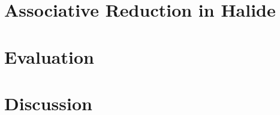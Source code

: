 \documentclass{main}
\begin{document}
\section{Associative Reduction in Halide}


\section{Evaluation}


\section{Discussion}



%
%
\end{document}
